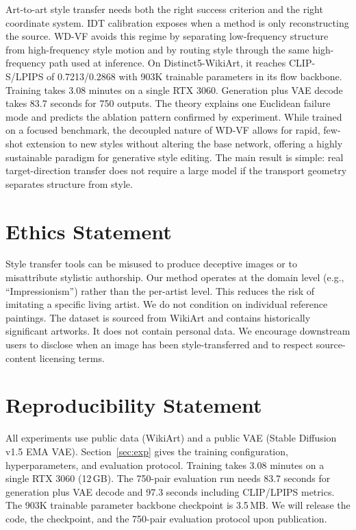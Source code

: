 \documentclass[letterpaper]{article}
\begin{document}
Art-to-art style transfer needs both the right success criterion and the right coordinate system.
IDT calibration exposes when a method is only reconstructing the source.
WD-VF avoids this regime by separating low-frequency structure from high-frequency style motion and by routing style through the same high-frequency path used at inference.
On Distinct5-WikiArt, it reaches CLIP-S/LPIPS of 0.7213/0.2868 with 903K trainable parameters in its flow backbone.
Training takes 3.08 minutes on a single RTX 3060.
Generation plus VAE decode takes 83.7 seconds for 750 outputs.
The theory explains one Euclidean failure mode and predicts the ablation pattern confirmed by experiment.
While trained on a focused benchmark, the decoupled nature of WD-VF allows for rapid, few-shot extension to new styles without altering the base network, offering a highly sustainable paradigm for generative style editing.
The main result is simple: real target-direction transfer does not require a large model if the transport geometry separates structure from style.

\section*{Ethics Statement}
Style transfer tools can be misused to produce deceptive images or to misattribute stylistic authorship.
Our method operates at the domain level (e.g., ``Impressionism'') rather than the per-artist level.
This reduces the risk of imitating a specific living artist.
We do not condition on individual reference paintings.
The dataset is sourced from WikiArt and contains historically significant artworks.
It does not contain personal data.
We encourage downstream users to disclose when an image has been style-transferred and to respect source-content licensing terms.

\section*{Reproducibility Statement}
All experiments use public data (WikiArt) and a public VAE (Stable Diffusion v1.5 EMA VAE).
Section~\ref{sec:exp} gives the training configuration, hyperparameters, and evaluation protocol.
Training takes 3.08 minutes on a single RTX 3060 (12\,GB).
The 750-pair evaluation run needs 83.7 seconds for generation plus VAE decode and 97.3 seconds including CLIP/LPIPS metrics.
The 903K trainable parameter backbone checkpoint is 3.5\,MB.
We will release the code, the checkpoint, and the 750-pair evaluation protocol upon publication.
\end{document}
